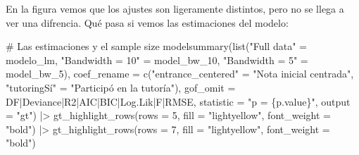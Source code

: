 \documentclass[
  letterpaper,
  DIV=11,
  numbers=noendperiod,
  oneside]{scrreprt}
\newenvironment{Shaded}{\begin{snugshade}}{\end{snugshade}}
\newcommand{\AttributeTok}[1]{\textcolor[rgb]{0.40,0.45,0.13}{#1}}
\newcommand{\CommentTok}[1]{\textcolor[rgb]{0.37,0.37,0.37}{#1}}
\newcommand{\DecValTok}[1]{\textcolor[rgb]{0.68,0.00,0.00}{#1}}
\newcommand{\FunctionTok}[1]{\textcolor[rgb]{0.28,0.35,0.67}{#1}}
\newcommand{\NormalTok}[1]{\textcolor[rgb]{0.00,0.23,0.31}{#1}}
\newcommand{\OtherTok}[1]{\textcolor[rgb]{0.00,0.23,0.31}{#1}}
\newcommand{\SpecialCharTok}[1]{\textcolor[rgb]{0.37,0.37,0.37}{#1}}
\newcommand{\StringTok}[1]{\textcolor[rgb]{0.13,0.47,0.30}{#1}}
\begin{document}
En la figura vemos que los ajustes son ligeramente distintos, pero no se
llega a ver una difrencia. Qué pasa si vemos las estimaciones del
modelo:

\begin{Shaded}
\begin{Highlighting}[]
\CommentTok{\# Las estimaciones y el sample size}
\FunctionTok{modelsummary}\NormalTok{(}\FunctionTok{list}\NormalTok{(}\StringTok{"Full data"} \OtherTok{=}\NormalTok{ modelo\_lm, }
                  \StringTok{"Bandwidth = 10"} \OtherTok{=}\NormalTok{ model\_bw\_10, }
                  \StringTok{"Bandwidth = 5"} \OtherTok{=}\NormalTok{ model\_bw\_5), }
             \AttributeTok{coef\_rename =} \FunctionTok{c}\NormalTok{(}\StringTok{"entrance\_centered"} \OtherTok{=} \StringTok{"Nota inicial centrada"}\NormalTok{,}
                             \StringTok{"tutoringSí"} \OtherTok{=} \StringTok{"Participó en la tutoría"}\NormalTok{),}
             \AttributeTok{gof\_omit =} \StringTok{\textquotesingle{}DF|Deviance|R2|AIC|BIC|Log.Lik|F|RMSE\textquotesingle{}}\NormalTok{,}
             \AttributeTok{statistic =} \StringTok{"p = \{p.value\}"}\NormalTok{, }
             \AttributeTok{output =} \StringTok{"gt"}\NormalTok{) }\SpecialCharTok{|\textgreater{}}
  \FunctionTok{gt\_highlight\_rows}\NormalTok{(}\AttributeTok{rows =} \DecValTok{5}\NormalTok{, }
                    \AttributeTok{fill =} \StringTok{"lightyellow"}\NormalTok{,}
                    \AttributeTok{font\_weight =} \StringTok{"bold"}\NormalTok{) }\SpecialCharTok{|\textgreater{}}
  \FunctionTok{gt\_highlight\_rows}\NormalTok{(}\AttributeTok{rows =} \DecValTok{7}\NormalTok{, }
                    \AttributeTok{fill =} \StringTok{"lightyellow"}\NormalTok{,}
                    \AttributeTok{font\_weight =} \StringTok{"bold"}\NormalTok{)}
\end{Highlighting}
\end{Shaded}
\end{document}
